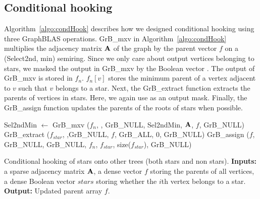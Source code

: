 \subsection{Conditional hooking}
Algorithm~\ref{algo:condHook} describes how we designed conditional hooking using three GraphBLAS operations.
GrB\_mxv in  Algorithm~\ref{algo:condHook} multiplies the adjacency matrix $\mathbf{A}$ of the graph by the parent vector $f$ on a (Select2nd, min) semiring. Since we only care about output vertices belonging to stars, we masked the output in GrB\_mxv by the Boolean vector .
The output of GrB\_mxv is stored in $f_n$.  $f_n[v]$ stores the minimum parent of a vertex adjacent to $v$ such that $v$ belongs to a star.  
Next, the GrB\_extract function extracts the parents of vertices in stars. Here, we again use  as an output mask.
Finally, the GrB\_assign function updates the parents of the roots of stars when possible.

\begin{algorithm}[htbp]
\begin{algorithmic}[1]
\begin{small}
	\State Sel2ndMin $\gets$ 
	\State GrB\_mxv ($f_n$, ,  GrB\_NULL,  Sel2ndMin,  $\mathbf{A}$,  $f$, GrB\_NULL) \li
	\State GrB\_extract ($f_{star}$, ,GrB\_NULL,  $f$,  GrB\_ALL, 0, GrB\_NULL) 
	\State GrB\_assign ($f$, GrB\_NULL,  GrB\_NULL,  $f_n$,  $f_{star}$,  size($f_{star}$), GrB\_NULL) 

 \EndProcedure
\end{small}
\end{algorithmic}
\caption{Conditional hooking of stars onto other trees (both stars and non stars).  {\bf Inputs:} a sparse adjacency matrix $\mathbf{A}$, a dense vector $f$ storing the parents of all vertices, a dense Boolean vector $stars$ storing whether the $i$th vertex belongs to a star.
{\bf Output:} Updated parent array $f$.}
\label{algo:condHook}
\end{algorithm}

